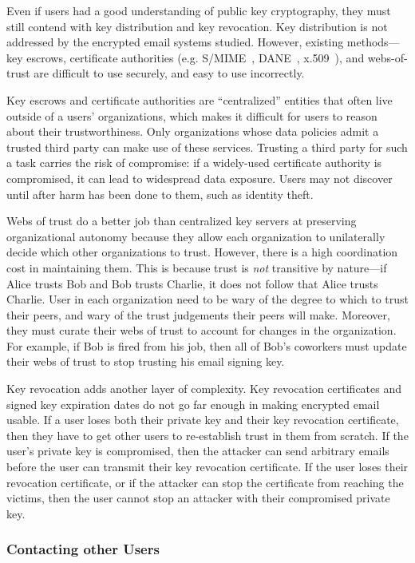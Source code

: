 Even if users had a good understanding of public key cryptography, they must still contend
with key distribution and key revocation.  Key distribution is not addressed by
the encrypted email systems studied.  However, existing methods---key escrows,
certificate authorities (e.g. S/MIME~\cite{smime}, DANE~\cite{dane},
x.509~\cite{x509}), and webs-of-trust are difficult to use securely, and easy to
use incorrectly.

Key escrows and certificate authorities are ``centralized''
entities that often live outside of a users' organizations, which makes it
difficult for users to reason about their trustworthiness.  Only organizations
whose data policies admit a trusted third party can make use of these services.
Trusting a third party for such a task carries the risk of compromise: if a
widely-used certificate authority is compromised, it can lead to widespread
data exposure.  Users may not discover until after harm has been done to
them, such as identity theft.

Webs of trust do a better job than centralized key servers at preserving
organizational autonomy because they allow each organization to unilaterally
decide which other organizations to trust.  However, there is a high
coordination cost in maintaining them.  This
is because trust is \emph{not} transitive by nature---if Alice trusts Bob and Bob
trusts Charlie, it does not follow that Alice trusts Charlie.  User in each
organization need to be wary of the degree to which to trust their peers, and wary of the trust
judgements their peers will make.  Moreover, they must curate their webs of
trust to account for changes in the organization.  For example, if Bob is fired
from his job, then all of Bob's coworkers must update their webs of trust to stop trusting his
email signing key.

Key revocation adds another layer of complexity.  Key revocation certificates
and signed key expiration dates do not go far enough in making encrypted email
usable.  If a user loses both their private key and their key revocation
certificate, then they have to get other users to re-establish trust in them
from scratch.  If the user's private key is compromised, then the attacker can
send arbitrary emails before the user can transmit their key revocation
certificate.  If the user loses their revocation certificate, or if the attacker
can stop the certificate from reaching the victims, then the user cannot stop an
attacker with their compromised private key.

\subsubsection{Contacting other Users}

